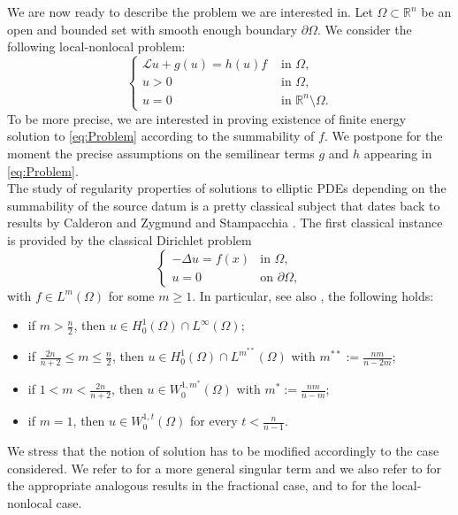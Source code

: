 \documentclass[11pt,a4paper]{amsart}
\theoremstyle{definition}
\theoremstyle{plain}
\numberwithin{equation}{section}
\begin{document}
We are now ready to describe the problem we are interested in.
Let $\Omega \subset \mathbb{R}^{n}$ be an open and bounded set with smooth enough boundary $\partial \Omega$.
We consider the following local-nonlocal problem:
\begin{equation}\label{eq:Problem}
	\left\{ \begin{array}{rl}
		\mathcal{L} u + g(u) = h(u)f & \textrm{ in } \Omega,\\
		u>0 & \textrm{ in } \Omega,\\
		u=0 & \textrm{ in } \mathbb{R}^{n}\setminus \Omega.
	\end{array}\right.
\end{equation}
To be more precise, we are interested in proving existence of finite energy solution to \eqref{eq:Problem} according to the summability of $f$. We postpone for the moment the precise assumptions on the semilinear terms $g$ and $h$ appearing in \eqref{eq:Problem}.\\
\noindent The study of regularity properties of solutions to elliptic PDEs depending on the summability of the source datum is a pretty classical subject that dates back to results by Calderon and Zygmund \cite{CalZyg}  and Stampacchia \cite{Stampacchia}. The first classical instance is provided by the classical Dirichlet problem 
\begin{equation}\label{eq:ClassicoDirichlet}
	\left\{\begin{array}{rl}
		-\Delta u = f(x) & \textrm{in } \Omega,\\
		u=0 & \textrm{on } \partial \Omega,
	\end{array}\right.
\end{equation}
\noindent with $f \in L^{m}(\Omega)$ for some $m\geq 1$. In particular, see also \cite{BoGa}, the following holds:
\begin{itemize}
	\item if $m>\tfrac{n}{2}$, then $u \in H^{1}_{0}(\Omega)\cap L^{\infty}(\Omega)$;
	\item if $\tfrac{2n}{n+2}\leq m \leq \tfrac{n}{2}$, then $u \in H^{1}_{0}(\Omega)\cap L^{m^{\ast \ast}}(\Omega)$ with $m^{\ast \ast}:=\tfrac{nm}{n-2m}$;
	\item if $1<m<\tfrac{2n}{n+2}$, then $u \in W^{1,m^{\ast}}_{0}(\Omega)$ with $m^{\ast}:=\tfrac{n m}{n-m}$;
	\item if $m=1$, then $u\in W^{1,t}_{0}(\Omega)$ for every $t<\tfrac{n}{n-1}$.
\end{itemize}
We stress that the notion of solution has to be modified accordingly to the case considered. We refer to \cite{OP2} for a more general singular term and we also refer to \cite{LPPS} for the appropriate analogous results in the fractional case, and to \cite{ArRa} for the local-nonlocal case. \\
\end{document}
